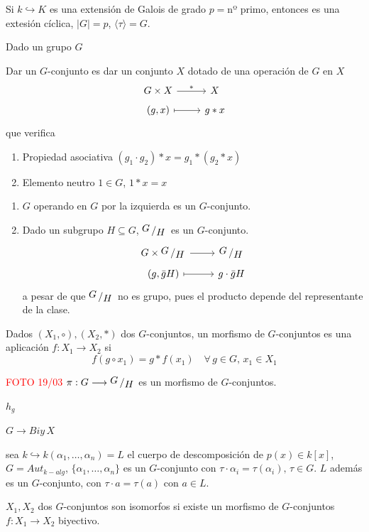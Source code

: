 Si $k \hookrightarrow K$ es una extensi\'on de Galois de grado $p=$nº primo, entonces es una extesi\'on c\'iclica, $|G| = p$, $\langle \tau\rangle = G$. 

Dado un grupo $G$
\begin{defi}
 Dar un $G$-conjunto es dar un conjunto $X$ dotado de una operaci\'on de $G$ en $X$
 $$\bt G \times X \rar{*} & X \\[-5mm] (g,x) \rarmaps & g *x \et$$
 que verifica 
 \begin{enumerate}
    \item Propiedad asociativa $(g_1\cdot g_2) * x = g_1 * (g_2* x)$
    \item Elemento neutro $1\in G$, $1*x=x$
 \end{enumerate}
\end{defi}
\begin{ejem}
    \begin{enumerate}
        \item $G$ operando en $G$ por la izquierda es un $G$-conjunto.
        \item Dado un subgrupo $H \subseteq G$, $\modulo{G}{H}$ es un $G$-conjunto.
        $$\bt G \times \modulo{G}{H}\rar & \modulo{G}{H}\\[-5mm] (g, \bar g H) \rarmaps & g \cdot \bar gH \et$$
        a pesar de que $\modulo{G}{H}$ no es grupo, pues el producto depende del representante de la clase.
    \end{enumerate}
\end{ejem}
\begin{defi}
Dados $(X_1, \circ), (X_2,*)$ dos $G$-conjuntos, un morfismo de $G$-conjuntos es una aplicaci\'on 
$f:X_1\longrightarrow X_2$ si $$f(g\circ x_1) = g*f(x_1) \quad \forall \, g \in G, \, x_1 \in X_1$$
\end{defi}
\begin{ejem} \textcolor{red}{FOTO 19/03}
    $\pi: G \longrightarrow \modulo{G}{H}$ es un morfismo de $G$-conjuntos.

    $h_g$
    
    $G\longrightarrow Biy \, X$

    sea $k\hookrightarrow k(\alpha_1, \ldots, \alpha_n) = L$ el cuerpo de descomposici\'on de $p(x) \in k[x]$, 
    $G = Aut_{k-alg}$, $\{\alpha_1, \ldots, \alpha_n\}$ es un $G$-conjunto con $\tau \cdot \alpha_i=\tau(\alpha_i), \, \tau\in G$. 
    $L$ adem\'as es un $G$-conjunto, con $\tau\cdot a = \tau(a)$ con $a\in L$.
\end{ejem}
\begin{defi}
    $X_1, X_2$ dos $G$-conjuntos son isomorfos si existe un morfismo de $G$-conjuntos $f:X_1\longrightarrow X_2$ biyectivo.
\end{defi}
